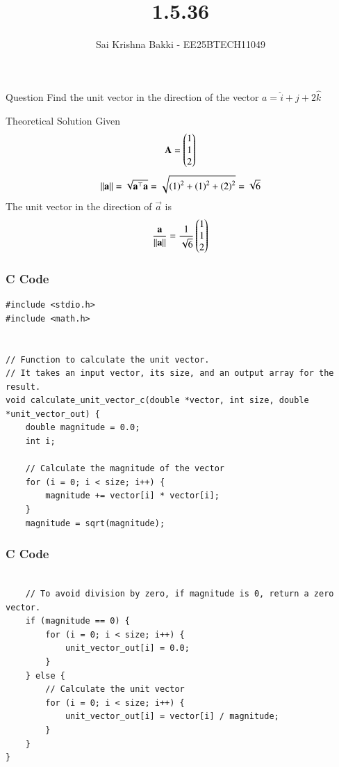 \documentclass{beamer}
\title %
{1.5.36}
\date{}
\author %
{Sai Krishna Bakki - EE25BTECH11049}
\begin{document}
\frame{\titlepage}
\begin{frame}{Question}
Find the unit vector in the direction of the  vector ${a} = \hat{i} + \hat{j} + 2\hat{k}$ 
\end{frame}

\begin{frame}{Theoretical Solution}
Given 
\begin{align}
\mathbf{A}= \begin{pmatrix}1 \\ 1 \\2 \end{pmatrix}
\end{align}
\begin{align}
    {||\mathbf{a}||} =\sqrt{\mathbf{a}^\top\mathbf{a}}=\sqrt{\left(1\right)^2+\left(1\right)^2+\left(2\right)^2}=\sqrt{6}
\end{align}
The unit vector in the direction of $\vec{a}$ is 
\begin{align}
    \frac{\mathbf{a}}{||\mathbf{a}||}=\frac{1}{\sqrt{6}}\begin{pmatrix}1\\1\\2\end{pmatrix}
\end{align}
\end{frame}
\begin{frame}[fragile]
\frametitle{C Code }
\begin{lstlisting}
#include <stdio.h>
#include <math.h>


// Function to calculate the unit vector.
// It takes an input vector, its size, and an output array for the result.
void calculate_unit_vector_c(double *vector, int size, double *unit_vector_out) {
    double magnitude = 0.0;
    int i;

    // Calculate the magnitude of the vector
    for (i = 0; i < size; i++) {
        magnitude += vector[i] * vector[i];
    }
    magnitude = sqrt(magnitude);
\end{lstlisting}
\end{frame}  

\begin{frame}[fragile]
\frametitle{C Code }
\begin{lstlisting}

    // To avoid division by zero, if magnitude is 0, return a zero vector.
    if (magnitude == 0) {
        for (i = 0; i < size; i++) {
            unit_vector_out[i] = 0.0;
        }
    } else {
        // Calculate the unit vector
        for (i = 0; i < size; i++) {
            unit_vector_out[i] = vector[i] / magnitude;
        }
    }
}
\end{lstlisting}
\end{frame}  
\end{document}
